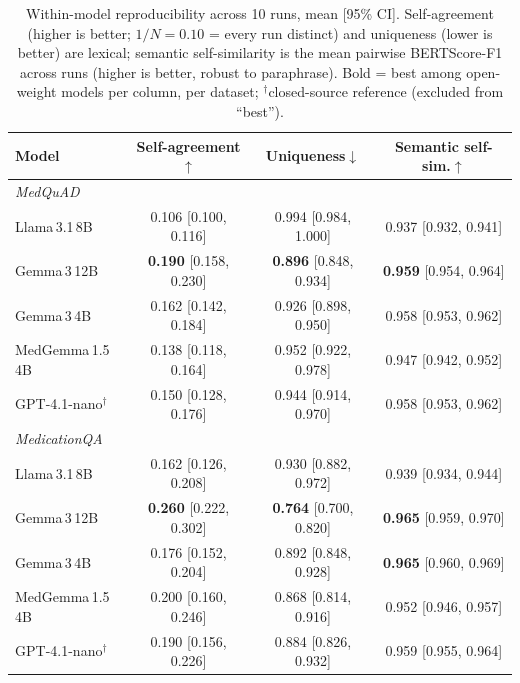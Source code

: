 \documentclass[11pt]{article}
\begin{document}
\begin{table}[h]
\centering
\caption{Within-model reproducibility across 10 runs, mean [95\% CI].
Self-agreement (higher is better; $1/N{=}0.10$ = every run distinct) and
uniqueness (lower is better) are lexical; semantic self-similarity is the
mean pairwise BERTScore-F1 across runs (higher is better, robust to
paraphrase). Bold = best among open-weight models per column, per dataset;
$^\dagger$closed-source reference (excluded from ``best'').}
\label{tab:repro}
\footnotesize
\begin{tabular}{lccc}
\toprule
\textbf{Model} & \textbf{Self-agreement}$\uparrow$ & \textbf{Uniqueness}$\downarrow$ & \textbf{Semantic self-sim.}$\uparrow$ \\
\midrule
\multicolumn{4}{l}{\emph{MedQuAD}}\\
Llama\,3.1\,8B      & 0.106 [0.100, 0.116] & 0.994 [0.984, 1.000] & 0.937 [0.932, 0.941] \\
Gemma\,3\,12B       & \textbf{0.190} [0.158, 0.230] & \textbf{0.896} [0.848, 0.934] & \textbf{0.959} [0.954, 0.964] \\
Gemma\,3\,4B        & 0.162 [0.142, 0.184] & 0.926 [0.898, 0.950] & 0.958 [0.953, 0.962] \\
MedGemma\,1.5\,4B   & 0.138 [0.118, 0.164] & 0.952 [0.922, 0.978] & 0.947 [0.942, 0.952] \\
GPT-4.1-nano$^\dagger$ & 0.150 [0.128, 0.176] & 0.944 [0.914, 0.970] & 0.958 [0.953, 0.962] \\
\midrule
\multicolumn{4}{l}{\emph{MedicationQA}}\\
Llama\,3.1\,8B      & 0.162 [0.126, 0.208] & 0.930 [0.882, 0.972] & 0.939 [0.934, 0.944] \\
Gemma\,3\,12B       & \textbf{0.260} [0.222, 0.302] & \textbf{0.764} [0.700, 0.820] & \textbf{0.965} [0.959, 0.970] \\
Gemma\,3\,4B        & 0.176 [0.152, 0.204] & 0.892 [0.848, 0.928] & \textbf{0.965} [0.960, 0.969] \\
MedGemma\,1.5\,4B   & 0.200 [0.160, 0.246] & 0.868 [0.814, 0.916] & 0.952 [0.946, 0.957] \\
GPT-4.1-nano$^\dagger$ & 0.190 [0.156, 0.226] & 0.884 [0.826, 0.932] & 0.959 [0.955, 0.964] \\
\bottomrule
\end{tabular}
\end{table}
\end{document}
